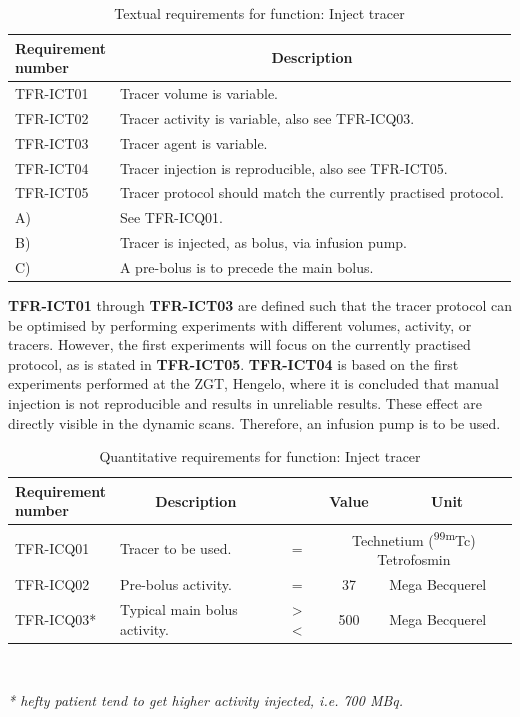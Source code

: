 \begin{table}[H]
\caption{Textual requirements for function: Inject tracer}
\label{tab:injtrac_text}
\begin{tabular}{l|p{115mm}|}
	\makecell[l]{\textbf{Requirement} \\  \textbf{number}} & \multicolumn{1}{c}{\textbf{Description}} \\
	\hline
	TFR-ICT01 			& Tracer volume is variable. \\
	TFR-ICT02			& Tracer activity is variable, also see TFR-ICQ03. \\
	TFR-ICT03			& Tracer agent is variable. \\
	TFR-ICT04 			& Tracer injection is reproducible, also see TFR-ICT05.\\
	TFR-ICT05 			& Tracer protocol should match the currently practised protocol. \\
	\hspace{1.5cm} A) 	& See TFR-ICQ01. \\
	\hspace{1.5cm} B) 	& Tracer is injected, as bolus, via infusion pump. \\
	\hspace{1.5cm} C) 	& A pre-bolus is to precede the main bolus. \\
	\cline{2-2}
\end{tabular}
\end{table}

\textbf{TFR-ICT01} through \textbf{TFR-ICT03} are defined such that the tracer protocol can be optimised by performing experiments with different volumes, activity, or tracers. However, the first experiments will focus on the currently practised protocol, as is stated in \textbf{TFR-ICT05}. \textbf{TFR-ICT04} is based on the first experiments performed at the ZGT, Hengelo, where it is concluded that manual injection is not reproducible and results in unreliable results. These effect are directly visible in the dynamic scans. Therefore, an infusion pump is to be used.

\begin{table}[H]
\caption{Quantitative requirements for function: Inject tracer}
\label{tab:injtrac_quan}
\begin{tabular}{l|p{65mm}ccp{20mm}|}
	\makecell[l]{\textbf{Requirement} \\  \textbf{number}} & \multicolumn{1}{c}{\textbf{Description}} & \multicolumn{1}{c}{ } & \multicolumn{1}{c}{\textbf{Value}} & \multicolumn{1}{c}{\textbf{Unit}} \\
	\hline
	TFR-ICQ01 	& Tracer to be used. 			& = 			& \multicolumn{2}{p{35mm}|}{Technetium (\textsuperscript{99m}Tc) Tetrofosmin} \\
	TFR-ICQ02 	& Pre-bolus activity.			& = 			& 37				& Mega Becquerel \\
	TFR-ICQ03*	& Typical main bolus activity. 	& > \spacing < 	& 500 \spacing 700 	& Mega Becquerel \\
	\cline{2-5}
\end{tabular} \\
\raggedright
\textit{* hefty patient tend to get higher activity injected, i.e. 700 MBq.}
\end{table}

